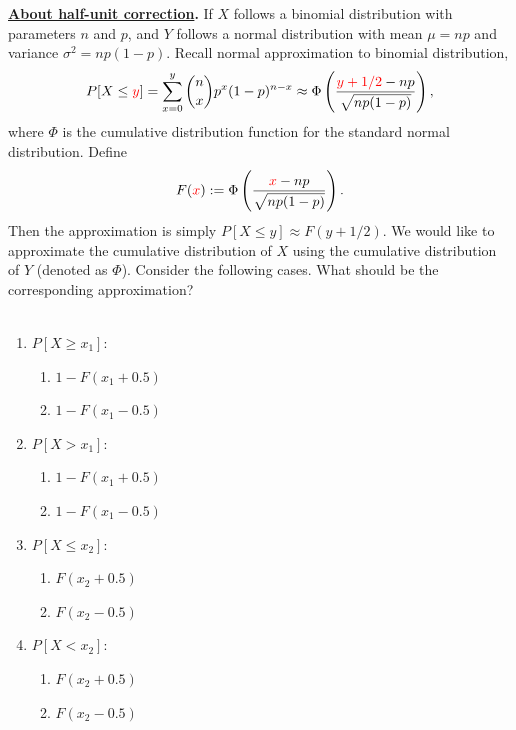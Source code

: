 \textbf{\underline{About half-unit correction}.} If $X$ follows a binomial distribution with parameters $n$ and $p$, and $Y$ follows a normal distribution with mean $\mu = np$ and variance $\sigma^2 = np(1-p)$. Recall normal approximation to binomial distribution,
\begin{align*}
P[X\leq \red{y}] = \sum_{x=0}^y \binom{n}{x} p^x(1-p)^{n-x} \approx \Phi\left(\frac{\red{y+1/2}-np}{\sqrt{np(1-p)}} \right),
\end{align*}
where $\Phi$ is the cumulative distribution function for the standard normal distribution. Define
\begin{align*}
F(\red{x}) := \Phi\left(\frac{\red{x}-np}{\sqrt{np(1-p)}} \right).
\end{align*}
Then the approximation is simply $P[X\leq y] \approx F(y+1/2)$. We would like to approximate the cumulative distribution of $X$ using the cumulative distribution of $Y$ (denoted as $\Phi$). Consider the following cases. What should be the corresponding approximation? \\
~\\
\begin{minipage}{0.3\linewidth}
	\begin{enumerate}
		\item $P[X \geq x_1]$:
		\begin{enumerate}
			\item $1 - F(x_1 + 0.5)$
			\item $1 - F(x_1 - 0.5)$
		\end{enumerate}
		\item $P[X > x_1]$:
		\begin{enumerate}
			\item $1 - F(x_1 + 0.5)$
			\item $1 - F(x_1 - 0.5)$
		\end{enumerate}
		\item $P[X \leq x_2]$:
		\begin{enumerate}
			\item $F(x_2 + 0.5)$
			\item $F(x_2 - 0.5)$
		\end{enumerate}
		\item $P[X < x_2]$:
		\begin{enumerate}
			\item $F(x_2 + 0.5)$
			\item $F(x_2 - 0.5)$
		\end{enumerate}
	\end{enumerate}
\end{minipage}
